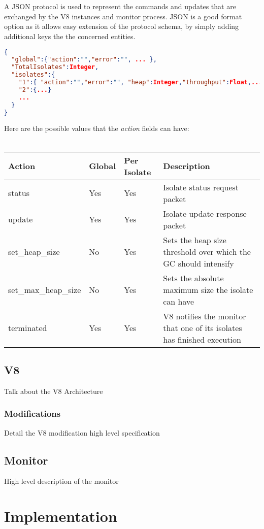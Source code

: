 \documentclass{l4proj}
\begin{document}
\\\\
\hspace*{3em} A JSON protocol is used to represent the commands and updates that are exchanged by the V8 instances and monitor process. JSON is a good format option as it allows easy extension of the protocol schema, by simply adding additional keys the the concerned entities.
\newpage
\begin{lstlisting}[language=json,firstnumber=1]
{
  "global":{"action":"","error":"", ... },
  "TotalIsolates":Integer,
  "isolates":{
    "1":{ "action":"","error":"", "heap":Integer,"throughput":Float,... },
    "2":{...}
    ...
  }
}
\end{lstlisting}
Here are the possible values that the \textit{action} fields can have:\\\\
\begin{tabular}{  l  l  l  l  }
  Action & Global & Per Isolate & Description \\
\hline
  status & Yes & Yes & Isolate status request packet\\
  update & Yes & Yes & Isolate update response packet\\
  set\_heap\_size & No & Yes & Sets the heap size threshold over which the GC should intensify\\
  set\_max\_heap\_size & No & Yes & Sets the absolute maximum size the isolate can have\\
  terminated & Yes & Yes & V8 notifies the monitor that one of its isolates has finished execution\\
\hline
\end{tabular}
\subsection{V8}
Talk about the V8 Architecture
\subsubsection{Modifications}
Detail the V8 modification high level specification
\subsection{Monitor}
High level description of the monitor

\section{Implementation}
\end{document}

